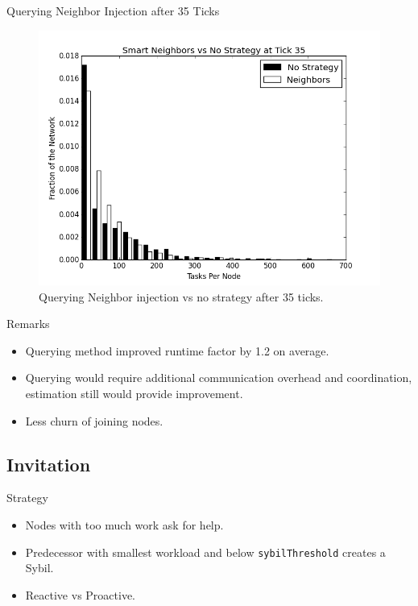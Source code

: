 \documentclass[11pt]{beamer}
\begin{document}
\begin{frame}{Querying Neighbor Injection after 35 Ticks}
\begin{figure}
	\centering
	\includegraphics[width=0.7\linewidth]{figs/neighborsStableSmartHist35}
	\caption[Smart Neighbor injection  vs no strategy after 35 ticks.]{Querying Neighbor injection  vs no strategy after 35 ticks.}
	\label{fig:neighborsStableSmartHist35}
\end{figure}
\end{frame}


\begin{frame}{Remarks}
	\begin{itemize}
		\item Querying method improved runtime factor by 1.2 on average.
		\item Querying would require additional communication overhead and coordination, estimation still would provide improvement.
		\item Less churn of joining nodes.
	\end{itemize}
\end{frame}

\subsection{Invitation}
\begin{frame}{Strategy}
	\begin{itemize}
		\item Nodes with too much work ask for help.
		\item Predecessor with smallest workload and below \texttt{sybilThreshold} creates a Sybil.
		\item Reactive vs Proactive.
	\end{itemize}
\end{frame}
\end{document}
